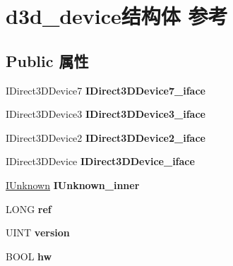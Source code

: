 \hypertarget{structd3d__device}{}\section{d3d\+\_\+device结构体 参考}
\label{structd3d__device}
\subsection*{Public 属性}
\begin{DoxyCompactItemize}
\item 
\mbox{\label{structd3d__device_adb8c076c511f73e45d54ad753373ea99}} 
I\+Direct3\+D\+Device7 {\bfseries I\+Direct3\+D\+Device7\+\_\+iface}
\item 
\mbox{\label{structd3d__device_a47a521a9cc5c9e2810b1c141ef726961}} 
I\+Direct3\+D\+Device3 {\bfseries I\+Direct3\+D\+Device3\+\_\+iface}
\item 
\mbox{\label{structd3d__device_abc6d6fb3fb9f72202129d760346036d8}} 
I\+Direct3\+D\+Device2 {\bfseries I\+Direct3\+D\+Device2\+\_\+iface}
\item 
\mbox{\label{structd3d__device_ac65f558bb4ab74694ccf9a9065422dca}} 
I\+Direct3\+D\+Device {\bfseries I\+Direct3\+D\+Device\+\_\+iface}
\item 
\mbox{\label{structd3d__device_ab2155a5201be4c33249ba15adf79ebd2}} 
\hyperlink{interface_i_unknown}{I\+Unknown} {\bfseries I\+Unknown\+\_\+inner}
\item 
\mbox{\label{structd3d__device_a98d0a16be7e49cdc277f660f0041eea1}} 
L\+O\+NG {\bfseries ref}
\item 
\mbox{\label{structd3d__device_a9bcc89c9b4767ad174cfc8abe83ae807}} 
U\+I\+NT {\bfseries version}
\item 
\mbox{\label{structd3d__device_aa0064457b7c976c0918314a226a31d13}} 
B\+O\+OL {\bfseries hw}
\item 
\mbox{\label{structd3d__device_a28bcdf72f8879b1f74c8e98367ed3db6}} 

\end{DoxyCompactItemize}
